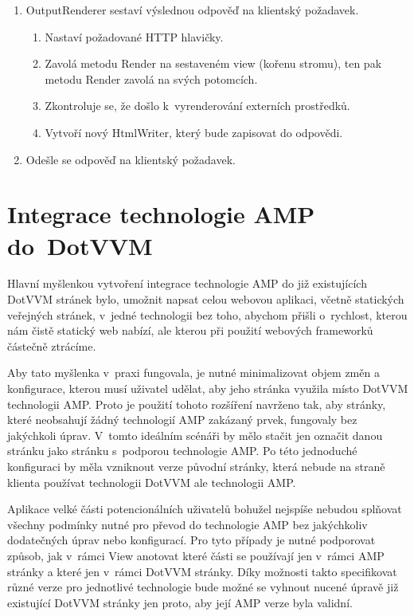 \begin{enumerate}
    \item OutputRenderer sestaví výslednou odpověď na klientský požadavek.
    \begin{enumerate}
        \item Nastaví požadované HTTP hlavičky.
        \item Zavolá metodu Render na sestaveném view (kořenu stromu), ten pak metodu Render zavolá na svých potomcích.
        \item Zkontroluje se, že došlo k~vyrenderování externích prostředků.
        \item Vytvoří nový HtmlWriter, který bude zapisovat do odpovědi.
    \end{enumerate}
    \item Odešle se odpověď na klientský požadavek.
\end{enumerate}

\chapter{Integrace technologie AMP do~DotVVM}
Hlavní myšlenkou vytvoření integrace technologie AMP do již existujících DotVVM stránek bylo,  umožnit napsat celou webovou aplikaci, včetně statických veřejných stránek, v~jedné technologii bez toho, abychom přišli o~rychlost, kterou nám čistě statický web nabízí, ale kterou při použití webových frameworků částečně ztrácíme.

Aby tato myšlenka v~praxi fungovala, je nutné minimalizovat objem změn a konfigurace, kterou musí uživatel udělat, aby jeho stránka využila místo DotVVM technologii AMP. Proto je použití tohoto rozšíření navrženo tak, aby stránky, které neobsahují žádný technologií AMP zakázaný prvek, fungovaly bez jakýchkoli úprav. V~tomto ideálním scénáři by mělo stačit jen označit danou stránku jako stránku s~podporou technologie AMP. Po této jednoduché konfiguraci by měla vzniknout verze původní stránky, která nebude na straně klienta používat technologii DotVVM ale technologii AMP.

Aplikace velké části potencionálních uživatelů bohužel nejspíše nebudou splňovat všechny podmínky nutné pro převod do technologie AMP bez jakýchkoliv dodatečných úprav nebo konfigurací. Pro tyto případy je nutné podporovat způsob, jak v~rámci View anotovat které části se používají jen v~rámci AMP stránky a které jen v~rámci DotVVM stránky. Díky možnosti takto specifikovat různé verze pro jednotlivé technologie bude možné se vyhnout nucené úpravě již existující DotVVM stránky jen proto, aby její AMP verze byla validní.

